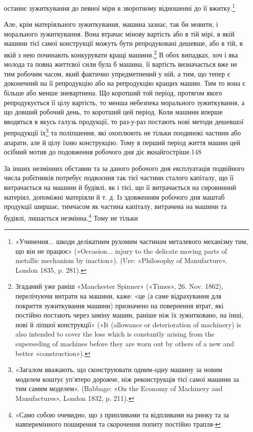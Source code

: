 \parcont{}  %
останнє зужиткування до певної міри в зворотному відношенні
до її вжитку.\footnote{
«Учинення... шкоди делікатним рухомим частинам металевого
механізму тим, що він не працює» («Occasion... injury to the delicate
moving parts of metallic mechanism by inaction»). (Ure: «Philosophy
of Manufacture», London 1835, p. 281).
}

Але, крім матеріяльного зужиткування, машина зазнає, так би
мовити, і морального зужиткування. Вона втрачає мінову вартість
або в тій мірі, в якій машини тієї самої конструкції можуть бути
репродуковані дешевше, або в тій, в якій з нею починають конкурувати
кращі машини.\footnote{
Згаданий уже раніш «Manchester Spinner» («Times», 26. Nov. 1862),
перелічуючи витрати на машини, каже: «це (а саме відрахування для покриття
зужиткування машини) призначено на повернення втрат, які постійно
постають через заміну машин, раніше ніж їх зужитковано, на інші,
нові й ліпшої конструкції» («It (allowance or deterioration of machinery)
is also intended to cover the loss which is constantly arising from the superseding
of machines before they are worn out by others of a new and better
«construction»).
} В обох випадках, хоч і яка молода
та повна життєвої сили була б машина, її вартість визначається вже
не тим робочим часом, який фактично упредметнений у ній, а тим,
що тепер є доконечний на її репродукцію або на репродукцію
кращих машин. Тим то вона є більше або менше зневартнена.
Що коротший той період, протягом якого репродукується її цілу
вартість, то менша небезпека морального зужиткування, а що
довший робочий день, то коротший цей період. Коли машини вперше
вводяться в якусь галузь продукції, то раз-у-раз постають
нові методи дешевшої репродукції їх\footnote{
«Загалом вважають, що сконструювати одним-одну машину за
новим моделем коштує уп’ятеро дорожче, ніж реконструкція тієї самої
машини за тим самим моделем». (Babbage: «On the Economy of Machinery
and Manufactures», London 1832, p. 211).
} та поліпшення, які охоплюють
не тільки поодинокі частини або апарати, але й цілу їхню
конструкцію. Тому в перший період життя машин цей осібний
мотив до подовження робочого дня діє якнайгостріше.148

За інших незмінних обставин та за даного робочого дня експлуатація
подвійного числа робітників потребує подвоєння так
тієї частини сталого капіталу, що її витрачається на машини й
будівлі, як і тієї, що її витрачається на сировинний матеріял,
допоміжні матеріяли й т. д. Із здовженням робочого дня маштаб
продукції ширшає, тимчасом як частина капіталу, витрачена
на машини та будівлі, лишається незмінна.\footnote{
«Само собою очевидно, що з припливами та відпливами на ринку
та за навперемінного поширення та скорочення попиту постійно трапля-
} Тому не тільки

